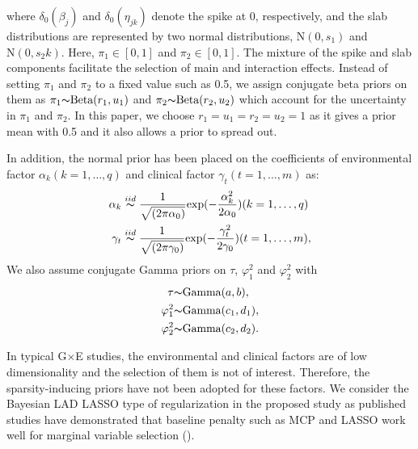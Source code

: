\documentclass[12pt]{article}
\begin{document}
where $\delta_{0}(\beta_j)$ and $\delta_{0}(\eta_{jk})$ denote the spike at 0, respectively, and the slab distributions are represented by two normal distributions, $\text{N}(0, s_1)$ and $\text{N}(0, s_2k)$. Here, $\pi_1 \in [0,1]$ and $\pi_2\in [0,1]$. The mixture of the spike and slab components facilitate the selection of main and interaction effects. Instead of setting $\pi_1$ and $\pi_2$ to a fixed value such as 0.5, 
we assign conjugate beta priors on them as $\pi_1{\thicksim}\text{Beta}(r_1,u_1)$ and $\pi_2{\thicksim}\text{Beta}(r_2,u_2)$ which account for the uncertainty in $\pi_1$ and $\pi_2$. In this paper, we choose $r_1 = u_1 = r_2 = u_2 = 1$ as it gives a prior mean with 0.5 and it also allows a prior to spread out.  

In addition, the normal prior has been placed on the coefficients of environmental factor $\alpha_k (k = 1,\dots, q)$ and clinical factor $\gamma_t (t = 1, \dots, m)$ as: 
\begin{equation*}
\begin{aligned}
\alpha_k& \stackrel{iid}{\thicksim}\frac{1}{\sqrt{(2\pi \alpha_0)}}\text{exp}(-\frac{\alpha_{k}^2}{2\alpha_0})(k = 1,\dots, q) \\
\gamma_t& \stackrel{iid}{\thicksim}\frac{1}{\sqrt{(2\pi \gamma_0)}}\text{exp}(-\frac{\gamma_{t}^2}{2\gamma_0})(t = 1, \dots, m), \\
\end{aligned}
\end{equation*}
We also assume conjugate Gamma priors on $\tau$, $\varphi_1^2$ and $\varphi_2^2$ with
\begin{equation*}\label{equr:full}
\begin{aligned}
\tau &{\thicksim}\text{Gamma}(a,b),\\
\varphi_1^2&{\thicksim}\text{Gamma}(c_1,d_1),\\
\varphi_2^2&{\thicksim}\text{Gamma}(c_2,d_2).
\end{aligned}
\end{equation*}


In typical G$\times$E studies, the environmental and clinical factors are of low dimensionality and the selection of them is not of interest. Therefore, the sparsity-inducing priors have not been adopted for these factors. We consider the Bayesian LAD LASSO type of regularization in the proposed study as published studies have demonstrated that baseline penalty such as MCP and LASSO work well for marginal variable selection (\cite{SLH,CZJ}). 
\end{document}
